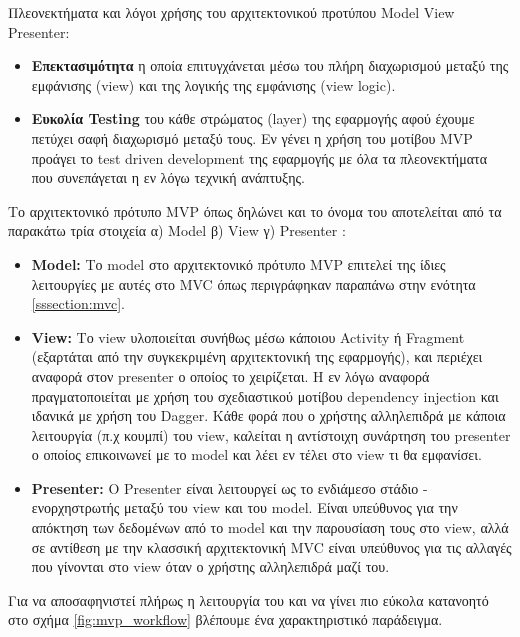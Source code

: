 	Πλεονεκτήματα και λόγοι χρήσης του αρχιτεκτονικού προτύπου Model View Presenter\cite{androidHacks}:
	\begin{itemize}
		\item \textbf{Επεκτασιμότητα} η οποία επιτυγχάνεται μέσω του πλήρη διαχωρισμού μεταξύ της εμφάνισης (view) και της λογικής της εμφάνισης (view logic). 
		\item \textbf{Ευκολία Testing} του κάθε στρώματος (layer) της εφαρμογής αφού έχουμε πετύχει σαφή διαχωρισμό μεταξύ τους. Εν γένει η χρήση του μοτίβου MVP προάγει το test driven development της εφαρμογής με όλα τα πλεονεκτήματα που συνεπάγεται η εν λόγω τεχνική ανάπτυξης.
	\end{itemize}
	
	Το αρχιτεκτονικό πρότυπο MVP όπως δηλώνει και το όνομα του αποτελείται από τα παρακάτω τρία στοιχεία α) Model β) View γ) Presenter :
	\begin{itemize}
		\item \textbf{Model: } Το model στο αρχιτεκτονικό πρότυπο MVP επιτελεί της ίδιες λειτουργίες με αυτές στο MVC όπως περιγράφηκαν παραπάνω στην ενότητα \ref{sssection:mvc}.
		\item \textbf{View: } Το view υλοποιείται συνήθως μέσω κάποιου Activity ή Fragment (εξαρτάται από την συγκεκριμένη αρχιτεκτονική της εφαρμογής), και περιέχει αναφορά στον presenter ο οποίος το χειρίζεται. H εν λόγω αναφορά πραγματοποιείται με χρήση του σχεδιαστικού μοτίβου dependency injection και ιδανικά με χρήση του Dagger. Κάθε φορά που ο χρήστης αλληλεπιδρά με κάποια λειτουργία (π.χ κουμπί) του view, καλείται η αντίστοιχη συνάρτηση του presenter ο οποίος επικοινωνεί με το model και λέει εν τέλει στο view τι θα εμφανίσει.
		\item \textbf{Presenter: } Ο Presenter είναι λειτουργεί ως το ενδιάμεσο στάδιο - ενορχηστρωτής μεταξύ του view και του model. Είναι υπεύθυνος για την απόκτηση των δεδομένων από το model και την παρουσίαση τους στο view, αλλά σε αντίθεση με την κλασσική αρχιτεκτονική MVC είναι υπεύθυνος για τις αλλαγές που γίνονται στο view όταν ο χρήστης αλληλεπιδρά μαζί του.
	\end{itemize}
	
	Για να αποσαφηνιστεί πλήρως η λειτουργία του και να γίνει πιο εύκολα κατανοητό στο σχήμα \ref{fig:mvp_workflow} βλέπουμε ένα χαρακτηριστικό παράδειγμα.
	
